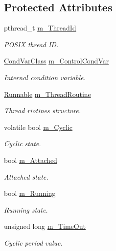 \subsection*{Protected Attributes}
\begin{DoxyCompactItemize}
\item 
pthread\+\_\+t \hyperlink{classPThreadClass_a10ae0a7572009a65e961e14e00368f04}{m\+\_\+\+Thread\+Id}
\begin{DoxyCompactList}\small\item\em P\+O\+S\+IX thread ID. \end{DoxyCompactList}\item 
\hyperlink{classCondVarClass}{Cond\+Var\+Class} \hyperlink{classPThreadClass_a47d4ad65715d6d9bed6987212f05839a}{m\+\_\+\+Control\+Cond\+Var}
\begin{DoxyCompactList}\small\item\em Internal condition variable. \end{DoxyCompactList}\item 
\hyperlink{structRunnable}{Runnable} \hyperlink{classPThreadClass_a80e0b0007257f5c9ef8d74ddacac4113}{m\+\_\+\+Thread\+Routine}
\begin{DoxyCompactList}\small\item\em Thread riotines structure. \end{DoxyCompactList}\item 
volatile bool \hyperlink{classPThreadClass_a6becb8dccddf8546a4091517c1cc5033}{m\+\_\+\+Cyclic}
\begin{DoxyCompactList}\small\item\em Cyclic state. \end{DoxyCompactList}\item 
bool \hyperlink{classPThreadClass_a1905932de950f876dbff1d07e6824954}{m\+\_\+\+Attached}
\begin{DoxyCompactList}\small\item\em Attached state. \end{DoxyCompactList}\item 
bool \hyperlink{classPThreadClass_a390356f43f2203acb2c0abd0f41fe9a1}{m\+\_\+\+Running}
\begin{DoxyCompactList}\small\item\em Running state. \end{DoxyCompactList}\item 
unsigned long \hyperlink{classPThreadClass_a73118712c992ed9921a928cf676bf4d6}{m\+\_\+\+Time\+Out}
\begin{DoxyCompactList}\small\item\em Cyclic period value. \end{DoxyCompactList}\item 

\end{DoxyCompactItemize}
